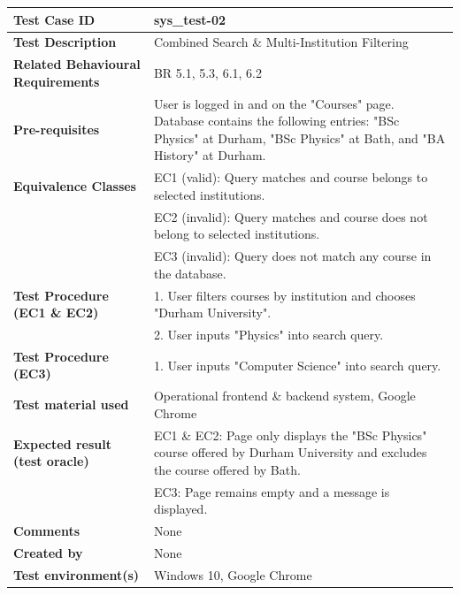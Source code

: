 \begin{table}[h!]
\small
\renewcommand{\arraystretch}{1.1}
\begin{tabularx}{\linewidth}{>{\bfseries}l X}
\hline
Test Case ID & sys\_test-02 \\ \hline
Test Description & Combined Search \& Multi-Institution Filtering \\ \hline
Related Behavioural Requirements & BR 5.1, 5.3, 6.1, 6.2 \\ \hline
Pre-requisites & User is logged in and on the "Courses" page. Database contains the following entries: "BSc Physics" at Durham, "BSc Physics" at Bath, and "BA History" at Durham. \\ \hline
Equivalence Classes & EC1 (valid): Query matches and course belongs to selected institutions.\\ & EC2 (invalid): Query matches and course does not belong to selected institutions. \\ & EC3 (invalid): Query does not match any course in the database. \\ \hline
Test Procedure (EC1 \& EC2) & 1. User filters courses by institution and chooses "Durham University". \\ & 2. User inputs "Physics" into search query. \\ \hline  
Test Procedure (EC3) & 
1. User inputs "Computer Science" into search query.\\ \hline
Test material used & Operational frontend \& backend system, Google Chrome \\ \hline
Expected result (test oracle) & EC1 \& EC2: Page only displays the "BSc Physics" course offered by Durham University and excludes the course offered by Bath. \\ & EC3: Page remains empty and a message is displayed. \\ \hline
Comments & None \\ \hline
Created by & None \\ \hline
Test environment(s) & Windows 10, Google Chrome \\ \hline
\end{tabularx}
\end{table}

